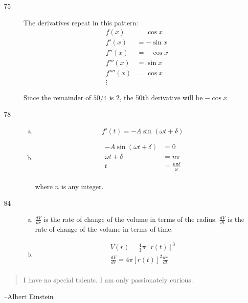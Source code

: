 \documentclass[letterpaper]{exam}
\begin{document}
\begin{description}
    \item[75]
      The derivatives repeat in this pattern:
      \begin{align*}
        f(x)     & = \cos x \\
        f'(x)    & = -\sin x \\
        f''(x)   & = -\cos x \\
        f'''(x)  & = \sin x \\
        f''''(x) & = \cos x \\
        \vdots
      \end{align*}

      Since the remainder of $50/4$ is 2, the 50th derivative will be $-\cos x$

    \item[78] 
      \begin{enumerate}[(a)]
        \item 
          \[
            f'(t) = -A \sin(\omega t + \delta)
          \]

        \item 
          \begin{align*}
            -A \sin(\omega t + \delta) & = 0 \\
            \omega t + \delta          & = n \pi \\
            t                          & = \boxed{ \frac{n \pi \delta}{\omega} } \\
          \end{align*}

          where $n$ is any integer.

      \end{enumerate}

    \item[84] 
      \begin{enumerate}[(a)]
        \item $\frac{dV}{dr}$ is the rate of change of the volume in terms of the radius.
          $\frac{dV}{dt}$ is the rate of change of the volume in terms of time.

        \item
          \begin{align*}
            V(r) = \frac{4}{3} \pi [r(t)]^3 \\
            \frac{dV}{dr} = 4 \pi [r(t)]^2 \frac{dr}{dt} \\
          \end{align*}
      \end{enumerate}
      
  \end{description}

  \else
    \vspace{10 cm}
    \begin{quote}
      \begin{em}
        I have no special talents. I am only passionately curious. 
      \end{em}
    \end{quote}
    \hspace{2 cm} --Albert Einstein
  \fi
\end{document}
